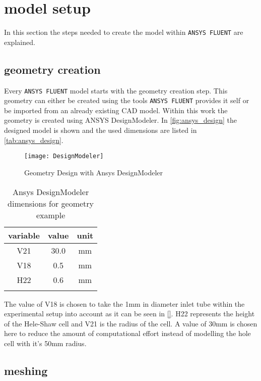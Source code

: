 \documentclass[../thesis.tex]{subfiles}
\begin{document}
\section{model setup}
\label{sec:mod_setup}

In this section the steps needed to create the model within \texttt{ANSYS FLUENT} are explained.

\subsection{geometry creation}

Every \texttt{ANSYS FLUENT} model starts with the geometry creation step. This geometry can either be created using the tools \texttt{ANSYS FLUENT} provides it self or be imported from an already existing CAD model. Within this work the geometry is created using ANSYS DesignModeler. In \autoref{fig:ansys_design} the designed model is shown and the used dimensions are listed in \autoref{tab:ansys_design}.

\begin{figure}[htbp]
	\centering
	\texttt{[image: DesignModeler]}
	\caption{Geometry Design with Ansys DesignModeler}
	\label{fig:ansys_design}
\end{figure}

\begin{table} [htb]
	\centering
	\caption{Ansys DesignModeler dimensions for geometry example}
	\begin{tabular}{ ccc }
		\hline
		variable & value & unit \\
		\hline
		V21 & 30.0 & mm \\
		V18 & 0.5 & mm \\
		H22 & 0.6 & mm \\
		\hline
		\label{tab:ansys_design}
	\end{tabular}
\end{table}

The value of V18 is chosen to take the 1mm in diameter inlet tube within the experimental setup into account as it can be seen in \autoref{}. H22 represents the height of the Hele-Shaw cell and V21 is the radius of the cell. A value of 30mm is chosen here to reduce the amount of computational effort instead of modelling the hole cell with it's 50mm radius.

\subsection{meshing}
\end{document}
